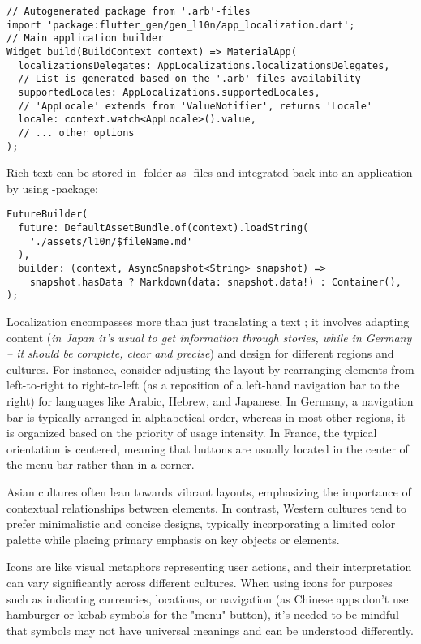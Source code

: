 \begin{lstlisting}
// Autogenerated package from '.arb'-files
import 'package:flutter_gen/gen_l10n/app_localization.dart';
// Main application builder
Widget build(BuildContext context) => MaterialApp(
  localizationsDelegates: AppLocalizations.localizationsDelegates,
  // List is generated based on the '.arb'-files availability
  supportedLocales: AppLocalizations.supportedLocales,
  // 'AppLocale' extends from 'ValueNotifier', returns 'Locale'
  locale: context.watch<AppLocale>().value,
  // ... other options
);
\end{lstlisting}

\noindent Rich text can be stored in -folder as -files and integrated back into an application by using 
-package:

\begin{lstlisting}
FutureBuilder(
  future: DefaultAssetBundle.of(context).loadString(
    './assets/l10n/$fileName.md'
  ),
  builder: (context, AsyncSnapshot<String> snapshot) =>
    snapshot.hasData ? Markdown(data: snapshot.data!) : Container(),
);
\end{lstlisting}

\noindent Localization encompasses more than just translating a text \cite{Hofs03}; it involves adapting content 
(\emph{in Japan it's usual to get information through stories, while in Germany -- it should be complete, clear and 
precise}) and design for different regions and cultures. For instance, consider adjusting the layout by rearranging 
elements from left-to-right to right-to-left (as a reposition of a left-hand navigation bar to the right) for languages 
like Arabic, Hebrew, and Japanese. In Germany, a navigation bar is typically arranged in alphabetical order, whereas 
in most other regions, it is organized based on the priority of usage intensity. In France, the typical orientation is 
centered, meaning that buttons are usually located in the center of the menu bar rather than in a corner.

Asian cultures often lean towards vibrant layouts, emphasizing the importance of contextual relationships between 
elements. In contrast, Western cultures tend to prefer minimalistic and concise designs, typically incorporating a 
limited color palette while placing primary emphasis on key objects or elements.

Icons are like visual metaphors representing user actions, and their interpretation can vary significantly across 
different cultures. When using icons for purposes such as indicating currencies, locations, or navigation (as Chinese 
apps don't use hamburger or kebab symbols for the "menu"-button), it's needed to be mindful that symbols may not have 
universal meanings and can be understood differently.

